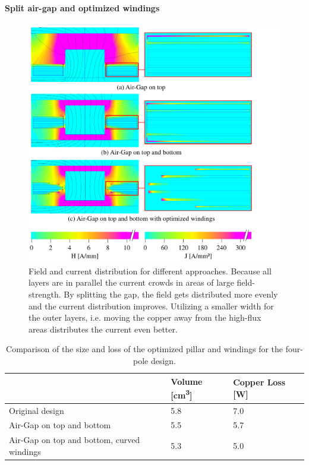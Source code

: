 \documentclass{IPEC2026}
\begin{document}
\paragraph{Split air-gap and optimized windings}
\begin{figure}
  \includegraphics[page=1, trim = 0cm 0cm 3cm 0cm, clip, width=\columnwidth]{figures/IPEC_Figure_AirGap.pdf}
  \caption{Field and current distribution for different approaches. Because all layers are in parallel the current crowds in areas of large field-strength. By splitting the gap, the field gets distributed more evenly and the current distribution improves. Utilizing a smaller width for the outer layers, i.e. moving the copper away from the high-flux areas distributes the current even better.}
  \label{fig:OptimizedGap}
\end{figure}

\begin{table}
  \centering
  \caption{Comparison of the size and loss of the optimized pillar and windings for the four-pole design.}
    \begin{tabular}{|p{}|p{}|p{}|}
    \hline  
      & {Volume [\unit{\cubic\cm}]} & {Copper Loss [\unit{\W}]} \\
    \hline
    \hline
    Original design & 5.8 & 7.0 \\
    \hline
    Air-Gap on top and bottom & 5.5 & 5.7 \\
    \hline
    Air-Gap on top and bottom, curved windings & 5.3 & 5.0 \\
    \hline
    \end{tabular}%
  \label{tab:OptimizationPQ}%
\end{table}%
\end{document}
